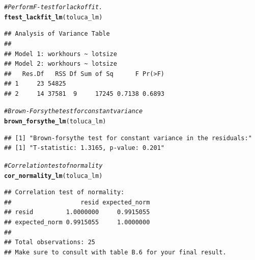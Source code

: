 \documentclass{article}\usepackage[]{graphicx}\usepackage[]{color}
\makeatletter
\newcommand{\hlcom}[1]{\textcolor[rgb]{0.678,0.584,0.686}{\textit{#1}}}%
\newcommand{\hlstd}[1]{\textcolor[rgb]{0.345,0.345,0.345}{#1}}%
\newcommand{\hlkwd}[1]{\textcolor[rgb]{0.737,0.353,0.396}{\textbf{#1}}}%
\newenvironment{kframe}{%
 \def\at@end@of@kframe{}%
 \ifinner\ifhmode%
  \def\at@end@of@kframe{\end{minipage}}%
  \begin{minipage}{\columnwidth}%
 \fi\fi%
 \def\FrameCommand##1{\hskip\@totalleftmargin \hskip-\fboxsep
 \colorbox{shadecolor}{##1}\hskip-\fboxsep
     \hskip-\linewidth \hskip-\@totalleftmargin \hskip\columnwidth}%
 \MakeFramed {\advance\hsize-\width
   \@totalleftmargin\z@ \linewidth\hsize
   \@setminipage}}%
 {\par\unskip\endMakeFramed%
 \at@end@of@kframe}
\newenvironment{knitrout}{}{} %
\makeatother
\begin{document}
\begin{knitrout}
\begin{kframe}
\begin{alltt}
\hlcom{# Perform F-test for lack of fit.}
\hlkwd{ftest_lackfit_lm}\hlstd{(toluca_lm)}
\end{alltt}
\begin{verbatim}
## Analysis of Variance Table
## 
## Model 1: workhours ~ lotsize
## Model 2: workhours ~ lotsize
##   Res.Df   RSS Df Sum of Sq      F Pr(>F)
## 1     23 54825                           
## 2     14 37581  9     17245 0.7138 0.6893
\end{verbatim}
\begin{alltt}
\hlcom{# Brown-Forsythe test for constant variance}
\hlkwd{brown_forsythe_lm}\hlstd{(toluca_lm)}
\end{alltt}
\begin{verbatim}
## [1] "Brown-forsythe test for constant variance in the residuals:"
## [1] "T-statistic: 1.3165, p-value: 0.201"
\end{verbatim}
\begin{alltt}
\hlcom{# Correlation test of normality}
\hlkwd{cor_normality_lm}\hlstd{(toluca_lm)}
\end{alltt}
\begin{verbatim}
## Correlation test of normality:
##                   resid expected_norm
## resid         1.0000000     0.9915055
## expected_norm 0.9915055     1.0000000
## 
## Total observations: 25
## Make sure to consult with table B.6 for your final result.
\end{verbatim}
\end{kframe}
\end{knitrout}
\end{document}
